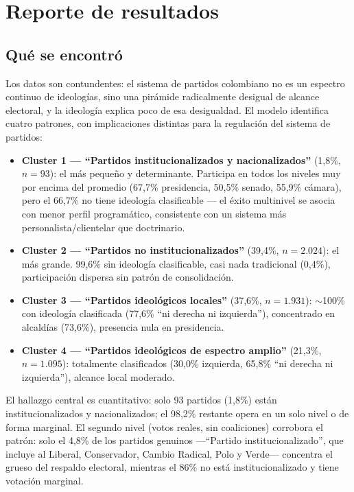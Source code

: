 \documentclass[11pt,letterpaper]{article}
\begin{document}
\section{Reporte de resultados}
\label{sec:resultados}

\subsection{Qué se encontró}

Los datos son contundentes: el sistema de partidos colombiano no es un espectro continuo de ideologías, sino una pirámide radicalmente desigual de alcance electoral, y la ideología explica poco de esa desigualdad. El modelo identifica cuatro patrones, con implicaciones distintas para la regulación del sistema de partidos:

\begin{itemize}[topsep=0.3em,itemsep=0.35em]
  \item \textbf{Cluster 1 --- ``Partidos institucionalizados y nacionalizados''} (1,8\%, $n=93$): el más pequeño y determinante. Participa en todos los niveles muy por encima del promedio (67,7\% presidencia, 50,5\% senado, 55,9\% cámara), pero el 66,7\% no tiene ideología clasificable --- el éxito multinivel se asocia con menor perfil programático, consistente con un sistema más personalista/clientelar que doctrinario.
  \item \textbf{Cluster 2 --- ``Partidos no institucionalizados''} (39,4\%, $n=2{.}024$): el más grande. 99,6\% sin ideología clasificable, casi nada tradicional (0,4\%), participación dispersa sin patrón de consolidación.
  \item \textbf{Cluster 3 --- ``Partidos ideológicos locales''} (37,6\%, $n=1{.}931$): $\sim$100\% con ideología clasificada (77,6\% ``ni derecha ni izquierda''), concentrado en alcaldías (73,6\%), presencia nula en presidencia.
  \item \textbf{Cluster 4 --- ``Partidos ideológicos de espectro amplio''} (21,3\%, $n=1{.}095$): totalmente clasificados (30,0\% izquierda, 65,8\% ``ni derecha ni izquierda''), alcance local moderado.
\end{itemize}

El hallazgo central es cuantitativo: solo 93 partidos (1,8\%) están institucionalizados y nacionalizados; el 98,2\% restante opera en un solo nivel o de forma marginal. El segundo nivel (votos reales, sin coaliciones) corrobora el patrón: solo el 4,8\% de los partidos genuinos ---``Partido institucionalizado'', que incluye al Liberal, Conservador, Cambio Radical, Polo y Verde--- concentra el grueso del respaldo electoral, mientras el 86\% no está institucionalizado y tiene votación marginal.
\end{document}
